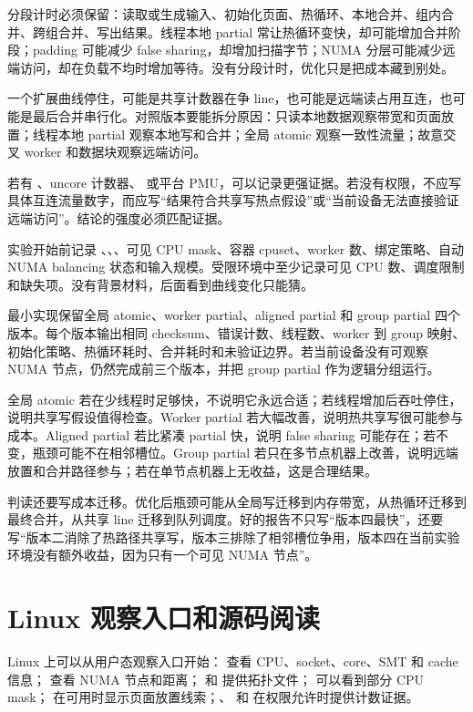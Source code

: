 分段计时必须保留：读取或生成输入、初始化页面、热循环、本地合并、组内合并、跨组合并、写出结果。线程本地 partial 常让热循环变快，却可能增加合并阶段；padding 可能减少 false sharing，却增加扫描字节；NUMA 分层可能减少远端访问，却在负载不均时增加等待。没有分段计时，优化只是把成本藏到别处。

一个扩展曲线停住，可能是共享计数器在争 line，也可能是远端读占用互连，也可能是最后合并串行化。对照版本要能拆分原因：只读本地数据观察带宽和页面放置；线程本地 partial 观察本地写和合并；全局 atomic 观察一致性流量；故意交叉 worker 和数据块观察远端访问。

若有 、uncore 计数器、 或平台 PMU，可以记录更强证据。若没有权限，不应写具体互连流量数字，而应写“结果符合共享写热点假设”或“当前设备无法直接验证远端访问”。结论的强度必须匹配证据。

实验开始前记录 、、、可见 CPU mask、容器 cpuset、worker 数、绑定策略、自动 NUMA balancing 状态和输入规模。受限环境中至少记录可见 CPU 数、调度限制和缺失项。没有背景材料，后面看到曲线变化只能猜。

最小实现保留全局 atomic、worker partial、aligned partial 和 group partial 四个版本。每个版本输出相同 checksum、错误计数、线程数、worker 到 group 映射、初始化策略、热循环耗时、合并耗时和未验证边界。若当前设备没有可观察 NUMA 节点，仍然完成前三个版本，并把 group partial 作为逻辑分组运行。

全局 atomic 若在少线程时足够快，不说明它永远合适；若线程增加后吞吐停住，说明共享写假设值得检查。Worker partial 若大幅改善，说明热共享写很可能参与成本。Aligned partial 若比紧凑 partial 快，说明 false sharing 可能存在；若不变，瓶颈可能不在相邻槽位。Group partial 若只在多节点机器上改善，说明远端放置和合并路径参与；若在单节点机器上无收益，这是合理结果。

判读还要写成本迁移。优化后瓶颈可能从全局写迁移到内存带宽，从热循环迁移到最终合并，从共享 line 迁移到队列调度。好的报告不只写“版本四最快”，还要写“版本二消除了热路径共享写，版本三排除了相邻槽位争用，版本四在当前实验环境没有额外收益，因为只有一个可见 NUMA 节点”。

\section{Linux 观察入口和源码阅读}

Linux 上可以从用户态观察入口开始： 查看 CPU、socket、core、SMT 和 cache 信息； 查看 NUMA 节点和距离； 和  提供拓扑文件； 可以看到部分 CPU mask； 在可用时显示页面放置线索；、 和  在权限允许时提供计数证据。

